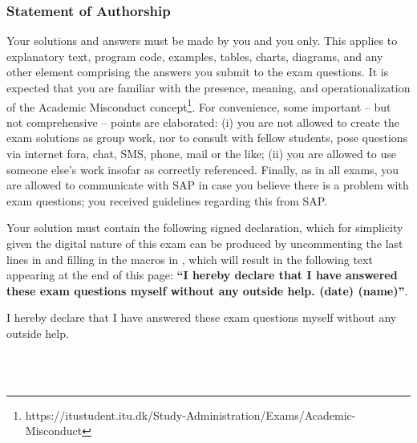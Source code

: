 
\subsubsection*{Statement of Authorship}
Your solutions and answers must be made by you and you only. 
This applies to 
explanatory text,
program code, 
examples, 
tables, 
charts, 
diagrams, and 
any other element comprising the answers you submit to the exam questions. 
It is expected that you are familiar with the presence, meaning, and operationalization of the Academic Misconduct concept\footnote{https://itustudent.itu.dk/Study-Administration/Exams/Academic-Misconduct}.
For convenience, some important -- but not comprehensive -- points are elaborated: 
(i) you are not allowed to create the exam solutions as group work, nor to consult with fellow students, pose questions via internet fora, chat, SMS, phone, mail or the like; 
(ii) you are allowed to use someone else's work insofar as correctly referenced. 
Finally, as in all exams, you are allowed to communicate with SAP in case you believe there is a problem with exam questions; you received guidelines regarding this from SAP.

Your solution must contain the following signed declaration, which for simplicity given the digital nature of this exam can be produced by uncommenting the last lines in  and filling in the macros in , which will result in the following text appearing at the end of this page: \textbf{``I hereby declare that I have answered these exam questions myself without any outside help. (date) (name)''}.

\vfill

\noindent I hereby declare that I have answered these exam questions myself without any outside help.%
\begin{flushright}
	\solutiondate \\
	\textbf{\solutionmyname} \\
	\end{flushright}